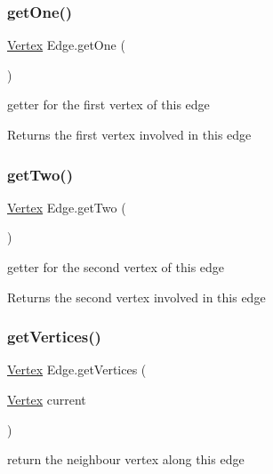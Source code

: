 \subsubsection{\texorpdfstring{get\+One()}{getOne()}}
{\footnotesize\ttfamily \hyperlink{class_vertex}{Vertex} Edge.\+get\+One (\begin{DoxyParamCaption}{ }\end{DoxyParamCaption})}



getter for the first vertex of this edge 

\begin{DoxyReturn}{Returns}
the first vertex involved in this edge 
\end{DoxyReturn}
\mbox{\label{class_edge_a676c0a445a28d7da2b1efd4e612f11eb}} 
\subsubsection{\texorpdfstring{get\+Two()}{getTwo()}}
{\footnotesize\ttfamily \hyperlink{class_vertex}{Vertex} Edge.\+get\+Two (\begin{DoxyParamCaption}{ }\end{DoxyParamCaption})}



getter for the second vertex of this edge 

\begin{DoxyReturn}{Returns}
the second vertex involved in this edge 
\end{DoxyReturn}
\mbox{\label{class_edge_abf42bcb6e0c33e5a66e73170d4591522}} 
\subsubsection{\texorpdfstring{get\+Vertices()}{getVertices()}}
{\footnotesize\ttfamily \hyperlink{class_vertex}{Vertex} Edge.\+get\+Vertices (\begin{DoxyParamCaption}\item[{\hyperlink{class_vertex}{Vertex}}]{current }\end{DoxyParamCaption})}



return the neighbour vertex along this edge 


